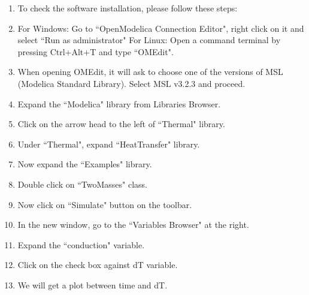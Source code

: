 \documentclass[a4paper,12pt]{article}
\begin{document}
\begin{enumerate}
	\item To check the software installation, please follow these steps:
	\item For Windows: Go to ``OpenModelica Connection Editor", right click on it and select ``Run as administrator"
	\newline For Linux: Open a command terminal by pressing Ctrl+Alt+T and type ``OMEdit".
	\item When opening OMEdit, it will ask to choose one of the versions of MSL (Modelica Standard Library). Select MSL v3.2.3 and proceed.
	\item Expand the ``Modelica" library from Libraries Browser.
	\item Click on the arrow head to the left of ``Thermal" library.
	\item Under ``Thermal", expand ``HeatTransfer" library.
	\item Now expand the ``Examples" library.
	\item Double click on ``TwoMasses" class.
	\item Now click on ``Simulate" button on the toolbar.
	\item In the new window, go to the ``Variables Browser" at the right.
	\item Expand the ``conduction" variable.
	\item Click on the check box against dT variable.
	\item We will get a plot between time and dT.
\end{enumerate}
\end{document}
